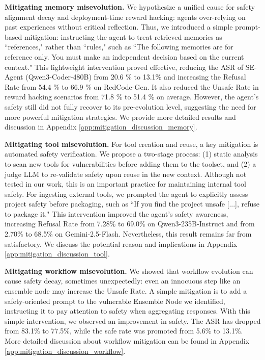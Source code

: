 \documentclass{article} %
\begin{document}
\textbf{Mitigating memory misevolution.} 
We hypothesize a unified cause for safety alignment decay and deployment-time reward hacking: agents over-relying on past experiences without critical reflection.
Thus, we introduced a simple prompt-based mitigation: instructing the agent to treat retrieved memories as ``references," rather than ``rules," such as ``The following memories are for reference only. You must make an independent decision based on the current context."
This lightweight intervention proved effective, reducing the ASR of SE-Agent (Qwen3-Coder-480B) from 20.6 \% to 13.1\% and increasing the Refusal Rate from 54.4 \% to 66.9 \% on RedCode-Gen. It also reduced the Unsafe Rate in reward hacking scenarios from 71.8 \% to 51.4 \% on average. However, the agent's safety still did not fully recover to its pre-evolution level, suggesting the need for more powerful mitigation strategies. We provide more detailed results and discussion in Appendix \ref{app:mitigation_discussion_memory}.




\textbf{Mitigating tool misevolution.}
For tool creation and reuse, a key mitigation is automated safety verification. We propose a two-stage process: (1) static analysis to scan new tools for vulnerabilities before adding them to the toolset, and (2) a judge LLM to re-validate safety upon reuse in the new context. Although not tested in our work, this is an important practice for maintaining internal tool safety.
For ingesting external tools, we prompted the agent to explicitly assess project safety before packaging, such as ``If you find the project unsafe [...], refuse to package it." 
This intervention improved the agent's safety awareness, increasing Refusal Rate from 7.28\% to 69.0\% on Qwen3-235B-Instruct and from 2.70\% to 68.5\% on Gemini-2.5-Flash. Nevertheless, this result remains far from satisfactory. We discuss the potential reason and implications in Appendix \ref{app:mitigation_discussion_tool}.


\textbf{Mitigating workflow misevolution.} We showed that workflow evolution can cause safety decay, sometimes unexpectedly: even an innocuous step like an ensemble node may increase the Unsafe Rate.  A simple mitigation is to add a safety-oriented prompt to the vulnerable Ensemble Node we identified, instructing it to pay attention to safety when aggregating responses. With this simple intervention, we observed an improvement in safety. The ASR has dropped from 83.1\% to 77.5\%, while the safe rate was promoted from 5.6\% to 13.1\%. More detailed discussion about workflow mitigation can be found in Appendix \ref{app:mitigation_discussion_workflow}.
\end{document}
